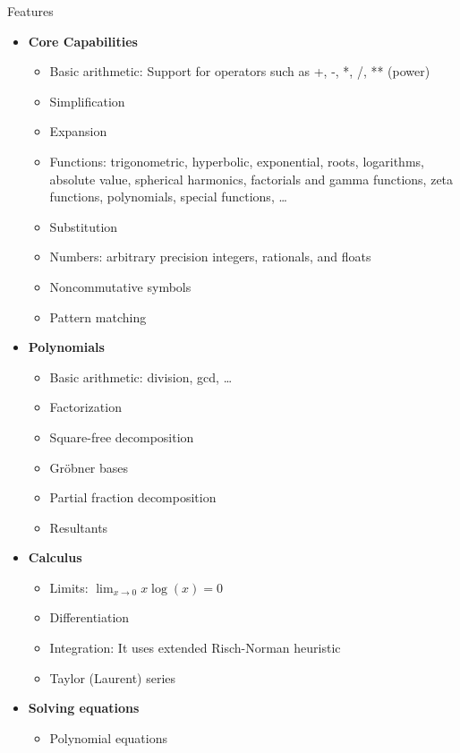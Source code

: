 \documentclass[xcolor=svgnames]{beamer}
\begin{document}
\begin{frame}{Features}
  \begin{multicols}{2}
    \tiny
    \begin{itemize}
    \item \textbf{Core Capabilities}
      \begin{itemize}
        \tiny
      \item Basic arithmetic: Support for operators such as +, -, *, /, ** (power)
      \item Simplification
      \item Expansion
      \item Functions: trigonometric, hyperbolic, exponential, roots, logarithms,
        absolute value, spherical harmonics, factorials and gamma functions, zeta
        functions, polynomials, special functions, \ldots
      \item Substitution
      \item Numbers: arbitrary precision integers, rationals, and floats
      \item Noncommutative symbols
      \item Pattern matching
      \end{itemize}
    \item \textbf{Polynomials}
      \begin{itemize}
        \tiny
      \item Basic arithmetic: division, gcd, \ldots
      \item Factorization
      \item Square-free decomposition
      \item Gröbner bases
      \item Partial fraction decomposition
      \item Resultants
      \end{itemize}
    \item \textbf{Calculus}
      \begin{itemize}
        \tiny
      \item Limits: $\lim_{x\to 0}{x\log(x)} = 0$
      \item Differentiation
      \item Integration: It uses extended Risch-Norman heuristic
      \item Taylor (Laurent) series
      \end{itemize}
    \item \textbf{Solving equations}
      \begin{itemize}
        \tiny
      \item Polynomial equations

\end{itemize}
\end{itemize}
\end{multicols}
\end{frame}
\end{document}
